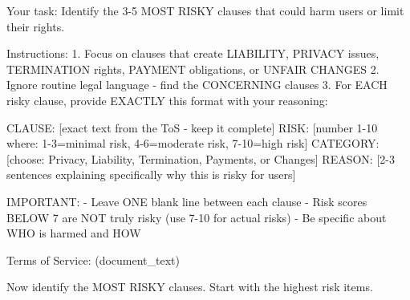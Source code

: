 Your task: Identify the 3-5 MOST RISKY clauses that could harm users or limit their rights.

Instructions:
1. Focus on clauses that create LIABILITY, PRIVACY issues, TERMINATION rights, PAYMENT obligations, or UNFAIR CHANGES
2. Ignore routine legal language - find the CONCERNING clauses
3. For EACH risky clause, provide EXACTLY this format with your reasoning:

CLAUSE: [exact text from the ToS - keep it complete]
RISK: [number 1-10 where: 1-3=minimal risk, 4-6=moderate risk, 7-10=high risk]
CATEGORY: [choose: Privacy, Liability, Termination, Payments, or Changes]
REASON: [2-3 sentences explaining specifically why this is risky for users]

IMPORTANT:
- Leave ONE blank line between each clause
- Risk scores BELOW 7 are NOT truly risky (use 7-10 for actual risks)
- Be specific about WHO is harmed and HOW

Terms of Service:
(document\_text)

Now identify the MOST RISKY clauses. Start with the highest risk items.


